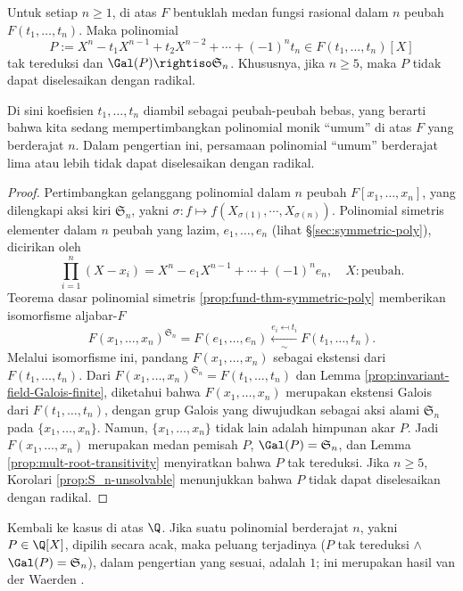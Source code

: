 \begin{theorem}\label{prop:Abel-Ruffini}
	Untuk setiap $n \geq 1$, di atas $F$ bentuklah medan fungsi rasional dalam $n$ peubah $F(t_1, \ldots, t_n)$. Maka polinomial
	\[ P := X^n - t_1 X^{n-1} + t_2 X^{n-2} + \cdots + (-1)^n t_n \in F(t_1, \ldots, t_n)[X] \]
	tak tereduksi dan $\Gal(P) \rightiso \mathfrak{S}_n$. Khususnya, jika $n \geq 5$, maka $P$ tidak dapat diselesaikan dengan radikal.
\end{theorem}
Di sini koefisien $t_1, \ldots, t_n$ diambil sebagai peubah-peubah bebas, yang berarti bahwa kita sedang mempertimbangkan polinomial monik ``umum'' di atas $F$ yang berderajat $n$. Dalam pengertian ini, persamaan polinomial ``umum'' berderajat lima atau lebih tidak dapat diselesaikan dengan radikal.

\begin{proof}
	Pertimbangkan gelanggang polinomial dalam $n$ peubah $F[x_1, \ldots, x_n]$, yang dilengkapi aksi kiri $\mathfrak{S}_n$, yakni $\sigma: f \mapsto f(X_{\sigma(1)}, \cdots, X_{\sigma(n)})$. Polinomial simetris elementer dalam $n$ peubah yang lazim, $e_1, \ldots, e_n$ (lihat \S\ref{sec:symmetric-poly}), dicirikan oleh
	\[ \prod_{i=1}^n (X - x_i) = X^n - e_1 X^{n-1} + \cdots + (-1)^n e_n, \quad X: \text{peubah}. \]
	Teorema dasar polinomial simetris \ref{prop:fund-thm-symmetric-poly} memberikan isomorfisme aljabar-$F$
	\[ F(x_1, \ldots, x_n)^{\mathfrak{S}_n} = F(e_1, \ldots, e_n) \xleftarrow[\sim]{e_i \mapsfrom t_i} F(t_1, \ldots, t_n). \]
	Melalui isomorfisme ini, pandang $F(x_1, \ldots, x_n)$ sebagai ekstensi dari $F(t_1, \ldots, t_n)$. Dari $F(x_1, \ldots, x_n)^{\mathfrak{S}_n} = F(t_1, \ldots, t_n)$ dan Lemma \ref{prop:invariant-field-Galois-finite}, diketahui bahwa $F(x_1, \ldots, x_n)$ merupakan ekstensi Galois dari $F(t_1, \ldots, t_n)$, dengan grup Galois yang diwujudkan sebagai aksi alami $\mathfrak{S}_n$ pada $\{x_1, \ldots, x_n\}$. Namun, $\{x_1, \ldots, x_n\}$ tidak lain adalah himpunan akar $P$. Jadi $F(x_1, \ldots, x_n)$ merupakan medan pemisah $P$, $\Gal(P) = \mathfrak{S}_n$, dan Lemma \ref{prop:mult-root-transitivity} menyiratkan bahwa $P$ tak tereduksi. Jika $n \geq 5$, Korolari \ref{prop:S_n-unsolvable} menunjukkan bahwa $P$ tidak dapat diselesaikan dengan radikal.
\end{proof}

Kembali ke kasus di atas $\Q$. Jika suatu polinomial berderajat $n$, yakni $P \in \Q[X]$, dipilih secara acak, maka peluang terjadinya ($P$ tak tereduksi \;$\wedge$\; $\Gal(P) = \mathfrak{S}_n$), dalam pengertian yang sesuai, adalah $1$; ini merupakan hasil van der Waerden \cite{vdW34}.

